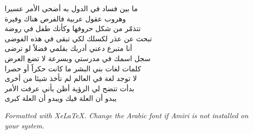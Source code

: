 \documentclass[letterpaper,12pt]{article}
\begin{document}
\begin{tcolorbox}[colback=boxcolor,colframe=headercolor,title=\textbf{Stanza 3},breakable]
{ما بين فساد في الدول به أضحى الأمر عسيرا \\
وهروب عقول عربية فالفرص هناك وفيرة \\
تتذمّر من شكل حروفها وكأنك طفل في روضة \\
تبحث عن عذر لكسلك لكي تبقى في هذه الفوضى \\
أنا متبرع دعني أدربك بقلمي فضلاً لو ترضى \\
سجل اسمك في مدرستي وبسرعة لا تضع العرض \\
كلمات لغات بني البشر ما كانت حكراً أو حصرا \\
لا توجد لغة في العالم لم تأخذ شيئا من أخرى \\
بدأت تتضح لي الرؤية أظن بأني عرفت الأمر \\
يبدو أن العلة فيك ويبدو أن العلة كبرى \\
}
\end{tcolorbox}

\vspace{12pt}
{\small\textit{Formatted with XeLaTeX. Change the Arabic font if Amiri is not installed on your system.}}
\end{document}

